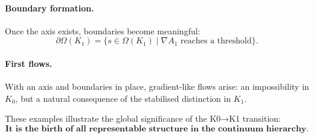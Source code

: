 \paragraph{Boundary formation.}
Once the axis exists, boundaries become meaningful:
\[
\partial\Omega(K_1) = \{ s \in \Omega(K_1) \mid \nabla A_1 \text{ reaches a threshold} \}.
\]

\paragraph{First flows.}
With an axis and boundaries in place, gradient-like flows arise:
an impossibility in $K_0$, but a natural consequence of the stabilised
distinction in $K_1$.

These examples illustrate the global significance of the K0→K1 transition:
\[
\textbf{It is the birth of all representable structure in the continuum hierarchy.}
\]

